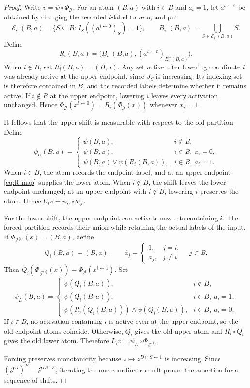 \documentclass[11pt,letterpaper]{article}
\theoremstyle{definition}
\theoremstyle{remark}
\newcommand{\cE}{\mathcal E}
\newcommand{\cJ}{\mathcal J}
\begin{document}
\begin{proof}
Write $v=\psi\circ\Phi_{\cJ}$.  For an atom $(B,a)$ with $i\in B$ and
$a_i=1$, let $a^{i\leftarrow0}$ be obtained by changing the recorded
$i$-label to zero, and put
\[
 \cE_i^-(B,a)=
 \{S\subseteq B:J_S((a^{i\leftarrow0})_S)=1\},\qquad
 B_i^-(B,a)=\bigcup_{S\in\cE_i^-(B,a)}S.
\]
Define
\begin{equation}
\label{eq:R-map}
 R_i(B,a)=
 \bigl(B_i^-(B,a),(a^{i\leftarrow0})_{B_i^-(B,a)}\bigr).
\end{equation}
When $i\notin B$, set $R_i(B,a)=(B,a)$.  Any set active after lowering
coordinate $i$ was already active at the upper endpoint, since $J_S$ is
increasing.  Its indexing set is therefore contained in $B$, and the
recorded labels determine whether it remains active.  If $i\notin B$ at the
upper endpoint, lowering $i$ leaves every activation unchanged.  Hence
$\Phi_{\cJ}(x^{i\leftarrow0})=R_i(\Phi_{\cJ}(x))$ whenever $x_i=1$.

It follows that the upper shift is measurable with respect to the old
partition.  Define
\[
 \psi_U(B,a)=
 \begin{cases}
 \psi(B,a),&i\notin B,\\
 \psi(B,a),&i\in B,\ a_i=0,\\
 \psi(B,a)\vee\psi(R_i(B,a)),&i\in B,\ a_i=1.
 \end{cases}
\]
When $i\in B$, the atom records the endpoint label, and at an upper
endpoint \eqref{eq:R-map} supplies the lower atom.  When $i\notin B$, the
shift leaves the lower endpoint unchanged; at an upper endpoint with
$i\notin B$, lowering $i$ preserves the atom.
Hence $U_iv=\psi_U\circ\Phi_{\cJ}$.

For the lower shift, the upper endpoint can activate new sets containing
$i$.  The forced partition records their union while retaining the actual
labels of the input.  If
$\Phi_{\cJ^{\{i\}}}(x)=(B,a)$, define
\[
 Q_i(B,a)=(B,\widehat a),\qquad
 \widehat a_j=
 \begin{cases}1,&j=i,\\a_j,&j\ne i,\end{cases}
 \quad j\in B.
\]
Then $Q_i(\Phi_{\cJ^{\{i\}}}(x))
=\Phi_{\cJ}(x^{i\leftarrow1})$.  Set
\[
 \psi_L(B,a)=
 \begin{cases}
 \psi(Q_i(B,a)),&i\notin B,\\
 \psi(Q_i(B,a)),&i\in B,\ a_i=1,\\
 \psi(R_i(Q_i(B,a)))\wedge\psi(Q_i(B,a)),
       &i\in B,\ a_i=0.
 \end{cases}
\]
If $i\notin B$, no activation containing $i$ is active even at the upper
endpoint, so the old endpoint atoms coincide.  Otherwise, $Q_i$ gives
the old upper atom and $R_i\circ Q_i$ gives the old lower atom.  Therefore
$L_iv=\psi_L\circ\Phi_{\cJ^{\{i\}}}$.

Forcing preserves monotonicity because $z\mapsto z^{D\cap S\leftarrow1}$
is increasing.  Since $(\cJ^D)^E=\cJ^{D\cup E}$, iterating the
one-coordinate result proves the assertion for a sequence of shifts.
\end{proof}
\end{document}
